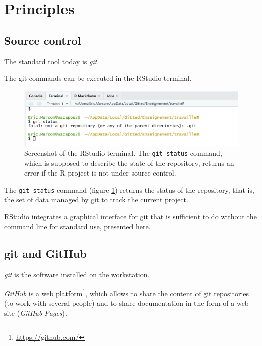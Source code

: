 \documentclass[
  12pt,
  american,
  a4paper,
  extrafontsizes,onecolumn,openright
  ]{memoir}
\newlength{\rf}
\begin{document}
\hypertarget{sec:principes-git}{%
\section{Principles}\label{sec:principes-git}}

\hypertarget{sec:git-cds}{%
\subsection{Source control}\label{sec:git-cds}}

The standard tool today is \emph{git}.

The git commands can be executed in the RStudio terminal.



\scriptsize

\begin{figure}

{\centering \includegraphics[width=0.8\linewidth]{images/git-Status} 

}

\caption{Screenshot of the RStudio terminal. The \texttt{git\ status} command, which is supposed to describe the state of the repository, returns an error if the R project is not under source control.}\label{fig:git-Status}
\end{figure}

\normalsize

The \texttt{git\ status} command (figure \ref{fig:git-Status}) returns the status of the repository, that is, the set of data managed by git to track the current project.

RStudio integrates a graphical interface for git that is sufficient to do without the command line for standard use, presented here.

\hypertarget{git-and-github-1}{%
\subsection{git and GitHub}\label{git-and-github-1}}

\emph{git} is the software installed on the workstation.

\emph{GitHub} is a web platform\footnote{\url{https://github.com/}}, which allows to share the content of git repositories (to work with several people) and to share documentation in the form of a web site (\emph{GitHub Pages}).
\end{document}
